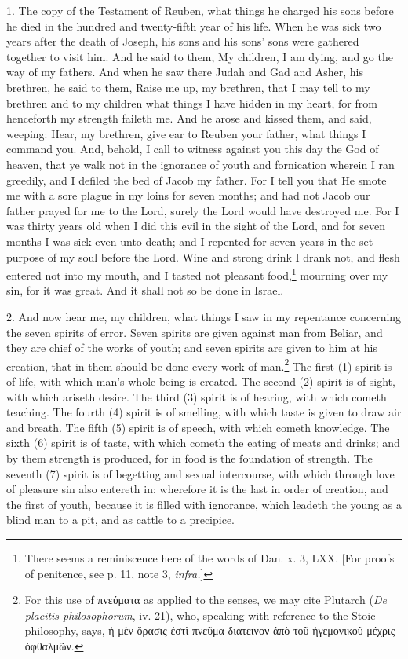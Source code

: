 1. The copy of the Testament of Reuben, what things he charged his sons before he died in the hundred and twenty-fifth year of his life. When he was sick two years after the death of Joseph, his sons and his sons’ sons were gathered together to visit him. And he said to them, My children, I am dying, and go the way of my fathers. And when he saw there Judah and Gad and Asher, his brethren, he said to them, Raise me up, my brethren, that I may tell to my brethren and to my children what things I have hidden in my heart, for from henceforth my strength faileth me. And he arose and kissed them, and said, weeping: Hear, my brethren, give ear to Reuben your father, what things I command you. And, behold, I call to witness against you this day the God of heaven, that ye walk not in the ignorance of youth and fornication wherein I ran greedily, and I defiled the bed of Jacob my father. For I tell you that He smote me with a sore plague in my loins for seven months; and had not Jacob our father prayed for me to the Lord, surely the Lord would have destroyed me. For I was thirty years old when I did this evil in the sight of the Lord, and for seven months I was sick even unto death; and I repented for seven years in the set purpose of my soul before the Lord. Wine and strong drink I drank not, and flesh entered not into my mouth, and I tasted not pleasant food,\footnote{There seems a reminiscence here of the words of Dan. x. 3, LXX. [For proofs of penitence, see p. 11, note 3, \emph{infra.}]} mourning over my sin, for it was great. And it shall not so be done in Israel.

2. And now hear me, my children, what things I saw in my repentance concerning the seven spirits of error. Seven spirits are given against man from Beliar, and they are chief of the works of youth; and seven spirits are given to him at his creation, that in them should be done every work of man.\footnote{For this use of \textgreek{πνεύματα} as applied to the senses, we may cite Plutarch (\emph{De placitis philosophorum}, iv. 21), who, speaking with reference to the Stoic philosophy, says, \textgreek{ἡ μὲν ὅρασις ἐστὶ πνεῦμα διατεινον ἀπὸ τοῦ ἡγεμονικοῦ μέχρις ὀφθαλμῶν}.} The first (1) spirit is of life, with which man’s whole being is created. The second (2) spirit is of sight, with which ariseth desire. The third (3) spirit is of hearing, with which cometh teaching. The fourth (4) spirit is of smelling, with which taste is given to draw air and breath. The fifth (5) spirit is of speech, with which cometh knowledge. The sixth (6) spirit is of taste, with which cometh the eating of meats and drinks; and by them strength is produced, for in food is the foundation of strength. The seventh (7) spirit is of begetting and sexual intercourse, with which through love of pleasure sin also entereth in: wherefore it is the last in order of creation, and the first of youth, because it is filled with ignorance, which leadeth the young as a blind man to a pit, and as cattle to a precipice.

